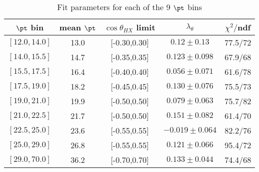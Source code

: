 \begin{table}[h!]
\centering
\begin{tabular}{c|c|c|c|c}
$\pt$ bin & mean $\pt$ & $\cos\theta_{HX}$ limit & $\lambda_\theta$ & $\chi^2/$ndf \\
\hline
$[12.0,14.0]$ & 13.0 & [-0.30,0.30] & $0.12\pm0.13$ & 77.5/72 \\
$[14.0,15.5]$ & 14.7 & [-0.35,0.35] & $0.123\pm0.098$ & 67.9/68 \\
$[15.5,17.5]$ & 16.4 & [-0.40,0.40] & $0.056\pm0.071$ & 61.6/78 \\
$[17.5,19.0]$ & 18.2 & [-0.45,0.45] & $0.130\pm0.076$ & 75.5/73 \\
$[19.0,21.0]$ & 19.9 & [-0.50,0.50] & $0.079\pm0.063$ & 75.7/82 \\
$[21.0,22.5]$ & 21.7 & [-0.50,0.50] & $0.151\pm0.082$ & 61.4/70 \\
$[22.5,25.0]$ & 23.6 & [-0.55,0.55] & $-0.019\pm0.064$ & 82.2/76 \\
$[25.0,29.0]$ & 26.8 & [-0.55,0.55] & $0.121\pm0.066$ & 95.4/72 \\
$[29.0,70.0]$ & 36.2 & [-0.70,0.70] & $0.133\pm0.044$ & 74.4/68 \\
\end{tabular}
\caption{Fit parameters for each of the 9 $\pt$ bins}
\label{t:fit}
\end{table}
